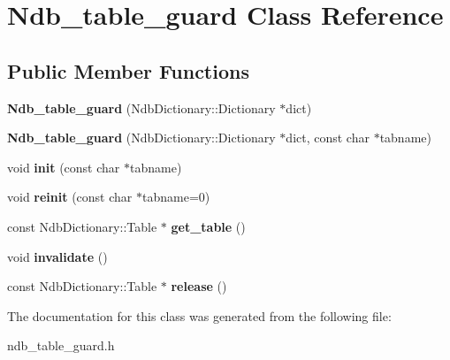 \hypertarget{classNdb__table__guard}{}\section{Ndb\+\_\+table\+\_\+guard Class Reference}
\label{classNdb__table__guard}
\subsection*{Public Member Functions}
\begin{DoxyCompactItemize}
\item 
\mbox{\label{classNdb__table__guard_a9cb77e816caa3ffd7e682dde6e74db94}} 
{\bfseries Ndb\+\_\+table\+\_\+guard} (Ndb\+Dictionary\+::\+Dictionary $\ast$dict)
\item 
\mbox{\label{classNdb__table__guard_a08b4193ad1f51b3ff71d124b52b6e14c}} 
{\bfseries Ndb\+\_\+table\+\_\+guard} (Ndb\+Dictionary\+::\+Dictionary $\ast$dict, const char $\ast$tabname)
\item 
\mbox{\label{classNdb__table__guard_a23a4d9f20607190573d35ad4bd428be8}} 
void {\bfseries init} (const char $\ast$tabname)
\item 
\mbox{\label{classNdb__table__guard_a14fc67585eda08d8736ea4584076fa29}} 
void {\bfseries reinit} (const char $\ast$tabname=0)
\item 
\mbox{\label{classNdb__table__guard_a10a8106e8f8e5a1989b3675e3e10f18e}} 
const Ndb\+Dictionary\+::\+Table $\ast$ {\bfseries get\+\_\+table} ()
\item 
\mbox{\label{classNdb__table__guard_a596dfc6b9a55e1f5a11dbccf0b060d7c}} 
void {\bfseries invalidate} ()
\item 
\mbox{\label{classNdb__table__guard_a51163308ec5e357f008e4f1183d6e673}} 
const Ndb\+Dictionary\+::\+Table $\ast$ {\bfseries release} ()
\end{DoxyCompactItemize}


The documentation for this class was generated from the following file\+:\begin{DoxyCompactItemize}
\item 
ndb\+\_\+table\+\_\+guard.\+h\end{DoxyCompactItemize}
